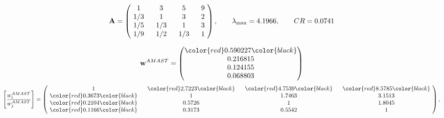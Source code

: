 \begin{example}
\begin{equation*}
\mathbf{A} =
\begin{pmatrix}
$\,\,$ 1 $\,\,$ & $\,\,$3$\,\,$ & $\,\,$5$\,\,$ & $\,\,$9 $\,\,$ \\
$\,\,$ 1/3$\,\,$ & $\,\,$ 1 $\,\,$ & $\,\,$3$\,\,$ & $\,\,$2 $\,\,$ \\
$\,\,$ 1/5$\,\,$ & $\,\,$ 1/3$\,\,$ & $\,\,$ 1 $\,\,$ & $\,\,$3 $\,\,$ \\
$\,\,$ 1/9$\,\,$ & $\,\,$ 1/2$\,\,$ & $\,\,$ 1/3$\,\,$ & $\,\,$ 1  $\,\,$ \\
\end{pmatrix},
\qquad
\lambda_{\max} =
4.1966,
\qquad
CR = 0.0741
\end{equation*}

\begin{equation*}
\mathbf{w}^{AMAST} =
\begin{pmatrix}
\color{red} 0.590227\color{black} \\
0.216815\\
0.124155\\
0.068803
\end{pmatrix}\end{equation*}
\begin{equation*}
\left[ \frac{{w}^{AMAST}_i}{{w}^{AMAST}_j} \right] =
\begin{pmatrix}
$\,\,$ 1 $\,\,$ & $\,\,$\color{red} 2.7223\color{black} $\,\,$ & $\,\,$\color{red} 4.7539\color{black} $\,\,$ & $\,\,$\color{red} 8.5785\color{black} $\,\,$ \\
$\,\,$\color{red} 0.3673\color{black} $\,\,$ & $\,\,$ 1 $\,\,$ & $\,\,$1.7463$\,\,$ & $\,\,$3.1513  $\,\,$ \\
$\,\,$\color{red} 0.2104\color{black} $\,\,$ & $\,\,$0.5726$\,\,$ & $\,\,$ 1 $\,\,$ & $\,\,$1.8045 $\,\,$ \\
$\,\,$\color{red} 0.1166\color{black} $\,\,$ & $\,\,$0.3173$\,\,$ & $\,\,$0.5542$\,\,$ & $\,\,$ 1  $\,\,$ \\
\end{pmatrix},
\end{equation*}


\end{example}
